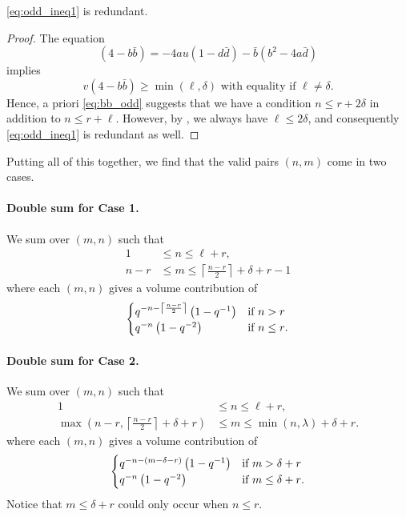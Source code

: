 \begin{claim}
  \eqref{eq:odd_ineq1} is redundant.
\end{claim}
\begin{proof}
  The equation
  \[ (4-b \bar b) = -4au(1-d\bar d) - \bar b(b^2-4a\bar d) \]
  implies
  \begin{equation}
    v(4-b\bar b) \ge \min(\ell,\delta) \text{ with equality if } \ell \neq \delta.
    \label{eq:bb_odd}
  \end{equation}
  Hence, a priori \eqref{eq:bb_odd} suggests that we have a condition
  $n \le r + 2 \delta$ in addition to $n \le r + \ell$.
  However, by , we always have $\ell \le 2 \delta$,
  and consequently \eqref{eq:odd_ineq1} is redundant as well.
\end{proof}

Putting all of this together, we find that the valid pairs $(n,m)$ come in two cases.

\paragraph{Double sum for Case 1.}
We sum over $(m,n)$ such that
\begin{equation}
  \begin{aligned}
    1 &\leq n \leq \ell + r, \\
    n-r &\leq m \leq \left\lceil \frac{n-r}{2} \right\rceil+\delta+r - 1
  \end{aligned}
  \label{eq:odd_range1}
\end{equation}
where each $(m,n)$ gives a volume contribution of
\[
  \begin{cases}
    q^{-n - \left\lceil \frac{n-r}{2} \right\rceil} \left( 1 - q^{-1} \right)
      & \text{if $n > r$} \\
    q^{-n} \left( 1 - q^{-2} \right)
      & \text{if $n \leq r$}.
  \end{cases}
\]

\paragraph{Double sum for Case 2.}
We sum over $(m,n)$ such that
\begin{equation}
  \begin{aligned}
    1 &\leq n \leq \ell + r, \\
    \max\left(n-r, \left\lceil \frac{n-r}{2} \right\rceil+\delta+r \right)
    &\leq m \leq \min(n,\lambda)+\delta+r.
  \end{aligned}
  \label{eq:odd_range2}
\end{equation}
where each $(m,n)$ gives a volume contribution of
\[
  \begin{cases}
    q^{-n - (m-\delta-r)} \left( 1 - q^{-1} \right)
      & \text{if $m > \delta + r$} \\
    q^{-n} \left( 1 - q^{-2} \right)
      & \text{if $m \le \delta + r$}.
  \end{cases}
\]
Notice that $m \leq \delta + r$ could only occur when $n \leq r$.

